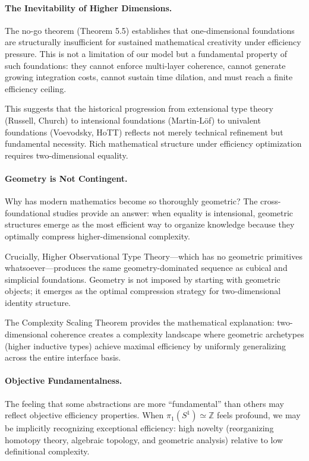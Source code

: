 \documentclass[11pt]{article}
\theoremstyle{definition}
\theoremstyle{remark}
\begin{document}
\paragraph{The Inevitability of Higher Dimensions.}
The no-go theorem (Theorem 5.5) establishes that one-dimensional foundations are structurally
insufficient for sustained mathematical creativity under efficiency pressure. This is not a limitation
of our model but a fundamental property of such foundations: they cannot enforce multi-layer
coherence, cannot generate growing integration costs, cannot sustain time dilation, and must reach
a finite efficiency ceiling.

This suggests that the historical progression from extensional type theory (Russell, Church)
to intensional foundations (Martin-L\"of) to univalent foundations (Voevodsky, HoTT) reflects not
merely technical refinement but fundamental necessity. Rich mathematical structure under efficiency
optimization requires two-dimensional equality.

\paragraph{Geometry is Not Contingent.}
Why has modern mathematics become so thoroughly geometric? The cross-foundational studies
provide an answer: when equality is intensional, geometric structures emerge as the most efficient
way to organize knowledge because they optimally compress higher-dimensional complexity.

Crucially, Higher Observational Type Theory---which has no geometric primitives whatsoever---produces the same geometry-dominated sequence as cubical and simplicial foundations. Geometry
is not imposed by starting with geometric objects; it emerges as the optimal compression strategy
for two-dimensional identity structure.

The Complexity Scaling Theorem provides the mathematical explanation: two-dimensional coherence
creates a complexity landscape where geometric archetypes (higher inductive types) achieve maximal
efficiency by uniformly generalizing across the entire interface basis.

\paragraph{Objective Fundamentalness.}
The feeling that some abstractions are more ``fundamental'' than others may reflect objective
efficiency properties. When $\pi_1(S^1) \simeq \mathbb{Z}$ feels profound, we may be implicitly recognizing
exceptional efficiency: high novelty (reorganizing homotopy theory, algebraic topology, and geometric
analysis) relative to low definitional complexity.
\end{document}
